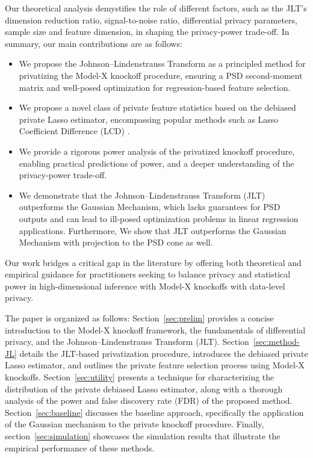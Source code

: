 \documentclass[11pt]{article}
\begin{document}
Our theoretical analysis demystifies the role of different factors, such as the JLT’s dimension reduction ratio, signal-to-noise ratio, differential privacy parameters, sample size and feature dimension, in shaping the privacy-power trade-off. In summary, our main contributions are as follows:
\begin{itemize}
\item We propose the Johnson--Lindenstrauss Transform as a principled method for privatizing the Model-X knockoff procedure, ensuring a PSD second-moment matrix and well-posed optimization for regression-based feature selection.

\item We propose a novel class of private feature statistics based on the debiased private Lasso estimator, encompassing popular methods such as Lasso Coefficient Difference (LCD) \citep{Barber_2015}.

\item We provide a rigorous power analysis of the privatized knockoff procedure, enabling practical predictions of power, and a deeper understanding of the privacy-power trade-off.

\item We demonstrate that the Johnson--Lindenstrauss Transform (JLT) outperforms the Gaussian Mechanism, which lacks guarantees for PSD outputs and can lead to ill-posed optimization problems in linear regression applications. Furthermore, We show that JLT outperforms the Gaussian Mechanism with projection to the PSD cone as well.
\end{itemize}

Our work bridges a critical gap in the literature by offering both theoretical and empirical guidance for practitioners seeking to balance privacy and statistical power in high-dimensional inference with Model-X knockoffs with data-level privacy.

The paper is organized as follows: Section~\ref{sec:prelim} provides a concise introduction to the Model-X knockoff framework, the fundamentals of differential privacy, and the Johnson--Lindenstrauss Transform (JLT). Section~\ref{sec:method-JL} details the JLT-based privatization procedure, introduces the debiased private Lasso estimator, and outlines the private feature selection process using Model-X knockoffs. Section~\ref{sec:utility} presents a technique for characterizing the distribution of the private debiased Lasso estimator, along with a thorough analysis of the power and false discovery rate (FDR) of the proposed method. Section~\ref{sec:baseline} discusses the baseline approach, specifically the application of the Gaussian mechanism to the private knockoff procedure. Finally, section~\ref{sec:simulation} showcases the simulation results that illustrate the empirical performance of these methods. 
\end{document}
